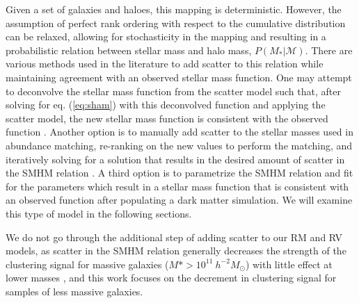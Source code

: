 \documentclass[a4paper,fleqn,usenatbib]{mnras}
\begin{document}
Given a set of galaxies and haloes, this mapping is deterministic.  However, the assumption of perfect rank ordering with respect to the cumulative distribution can be relaxed, allowing for stochasticity in the mapping and resulting in a probabilistic relation between stellar mass and halo mass, $P(M_*|\mathcal{M})$.  There are various methods used in the literature to add scatter to this relation while maintaining agreement with an observed stellar mass function.  One may attempt to deconvolve the stellar mass function from the scatter model such that, after solving for eq. (\ref{eq:sham}) with this deconvolved function and applying the scatter model, the new stellar mass function is consistent with the observed function \citep[e.g.][]{Behroozi:2010ja}.  Another option is to manually add scatter to the stellar masses used in abundance matching, re-ranking on the new values to perform the matching, and iteratively solving for a solution that results in the desired amount of scatter in the SMHM relation \citep[e.g.][]{Hearin:2013ok}.  A third option is to parametrize the SMHM relation and fit for the parameters which result in a stellar mass function that is consistent with an observed function after populating a dark matter simulation.  We will examine this type of model in the following sections.

We do not go through the additional step of adding scatter to our RM and RV models, as scatter in the SMHM relation generally decreases the strength of the clustering signal for massive galaxies ($M* > 10^{11} ~h^{-2} M_{\odot}$) with little effect at lower masses \citep{Tinker:2016vu}, and this work focuses on the decrement in clustering signal for samples of less massive galaxies.

\end{document}
